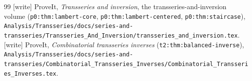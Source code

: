 \documentclass[11pt]{article}
\theoremstyle{remark}\newtheorem{remark}[theorem]{Remark}
\begin{document}
\begin{thebibliography}{99}
 [write] ProveIt, \emph{Transseries and inversion}, the
transseries-and-inversion volume (\texttt{p0:thm:lambert-core},
\texttt{p0:thm:lambert-centered}, \texttt{p0:thm:staircase}),
\nolinkurl{Analysis/Transseries/docs/series-and-transseries/Transseries_And_Inversion/transseries_and_inversion.tex}.
 [write] ProveIt, \emph{Combinatorial transseries
inverses} (\texttt{t2:thm:balanced-inverse}),
\nolinkurl{Analysis/Transseries/docs/series-and-transseries/Combinatorial_Transseries_Inverses/Combinatorial_Transseries_Inverses.tex}.
\end{thebibliography}
\endgroup
\end{document}
